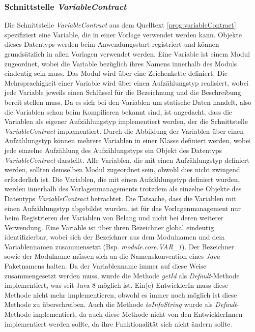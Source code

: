 \subsubsection{Schnittstelle \emph{VariableContract}}
\label{sec:variableContract}
Die Schnittstelle \emph{VariableContract} aus dem Quelltext \ref{prog:variableContract} spezifiziert eine Variable, die in einer Vorlage verwendet werden kann. Objekte dieses Datentyps werden beim Anwendungsstart registriert und können grundsätzlich in allen Vorlagen verwendet werden. Eine Variable ist einem Modul zugeordnet, wobei die Variable bezüglich ihres Namens innerhalb des Moduls eindeutig sein muss. Das Modul wird über eine Zeichenkette definiert. Die Mehrsprachigkeit einer Variable wird über einen Aufzählungstyp realisiert, wobei jede Variable jeweils einen Schlüssel für die Bezeichnung und die Beschreibung bereit stellen muss.
\newline
\newline
Da es sich bei den Variablen um statische Daten handelt, also die Variablen schon beim Kompilieren bekannt sind, ist angedacht, dass die Variablen als eigener Aufzählungstyp implementiert werden, der die Schnittstelle \emph{VariableContract} implementiert. Durch die Abbildung der Variablen über einen  Aufzählungstyp können mehrere Variablen in einer Klasse definiert werden, wobei jede einzelne Aufzählung des Aufzählungstyps ein Objekt des Datentyps \emph{VariableContract} darstellt. Alle Variablen, die mit einen Aufzählungstyp definiert werden, sollten demselben Modul zugeordnet sein, obwohl dies nicht zwingend erforderlich ist. Die Variablen, die mit einen Aufzählungstyp definiert wurden, werden innerhalb des Vorlagenmanagements trotzdem als einzelne Objekte des Datentyps  \emph{VariableContract} betrachtet. Die Tatsache, dass die Variablen mit einen Aufzählungstyp abgebildet wurden, ist für das Vorlagenmanagement nur beim Registrieren der Variablen von Belang und nicht bei deren weiterer Verwendung.
\newline
\newline
Eine Variable ist über ihren Bezeichner global eindeutig identifizierbar, wobei sich der Bezeichner aus dem Modulnamen und dem Variablennamen zusammensetzt (Bsp. \emph{module.core.VAR\_1}). Der Bezeichner sowie der Modulname müssen sich an die Namenskonvention eines \emph{Java}-Paketnamens halten. Da der Variablenname immer auf diese Weise zusammengesetzt werden muss, wurde die Methode \emph{getId} als \emph{Default}-Methode implementiert, was seit Java 8 möglich ist. Ein(e) EntwicklerIn muss diese Methode nicht mehr implementieren, obwohl es immer noch möglich ist diese Methode zu überschreiben. Auch die Methode \emph{toInfoString} wurde als \emph{Default}-Methode implementiert, da auch diese Methode nicht von den EntwicklerInnen implementiert werden sollte, da ihre Funktionalität sich nicht ändern sollte.
